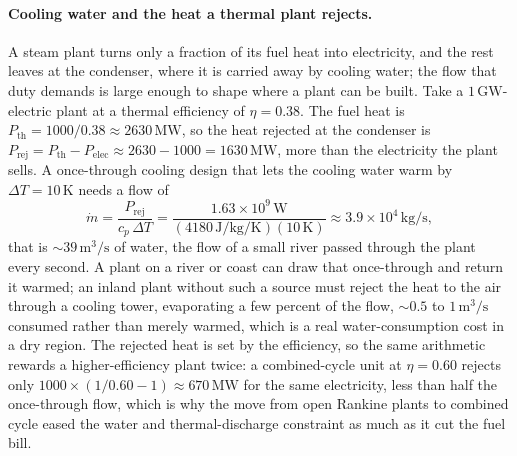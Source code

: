 \paragraph{Cooling water and the heat a thermal plant rejects.} A steam plant
turns only a fraction of its fuel heat into electricity, and the rest leaves at
the condenser, where it is carried away by cooling water; the flow that duty
demands is large enough to shape where a plant can be built. Take a
$1\,\si{\giga\watt}$-electric plant at a thermal efficiency of $\eta = 0.38$.
The fuel heat is $P_{\text{th}} = 1000/0.38 \approx 2630\,\si{\mega\watt}$, so
the heat rejected at the condenser is $P_{\text{rej}} = P_{\text{th}} -
P_{\text{elec}} \approx 2630 - 1000 = 1630\,\si{\mega\watt}$, more than the
electricity the plant sells. A once-through cooling design that lets the
cooling water warm by $\Delta T = 10\,\si{\kelvin}$ needs a flow of
\[
\dot{m} = \frac{P_{\text{rej}}}{c_p\,\Delta T}
= \frac{1.63\times 10^9\,\si{\watt}}
{(4180\,\si{\joule\per\kilogram\per\kelvin})(10\,\si{\kelvin})}
\approx 3.9\times 10^4\,\si{\kilogram\per\second},
\]
that is $\sim 39\,\si{\meter\cubed\per\second}$ of water, the flow of a small
river passed through the plant every second. A plant on a river or coast can
draw that once-through and return it warmed; an inland plant without such a
source must reject the heat to the air through a cooling tower, evaporating a
few percent of the flow, $\sim 0.5$ to $1\,\si{\meter\cubed\per\second}$
consumed rather than merely warmed, which is a real water-consumption cost in a
dry region. The rejected heat is set by the efficiency, so the same arithmetic
rewards a higher-efficiency plant twice: a combined-cycle unit at $\eta = 0.60$
rejects only $1000\times(1/0.60 - 1) \approx 670\,\si{\mega\watt}$ for the same
electricity, less than half the once-through flow, which is why the move from
open Rankine plants to combined cycle eased the water and thermal-discharge
constraint as much as it cut the fuel bill.

